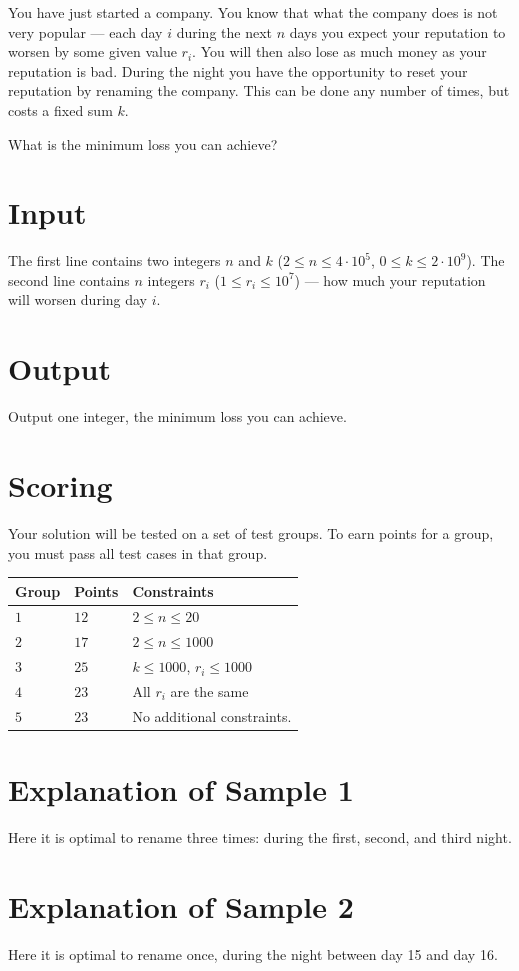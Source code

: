 You have just started a company.
You know that what the company does is not very popular ---
each day $i$ during the next $n$ days you expect your reputation to worsen by some given value $r_i$.
You will then also lose as much money as your reputation is bad.
During the night you have the opportunity to reset your reputation by renaming the company.
This can be done any number of times, but costs a fixed sum $k$.

What is the minimum loss you can achieve?

\section*{Input}
The first line contains two integers $n$ and $k$ ($2 \leq n \leq 4 \cdot 10^5$, $0 \leq k \leq 2 \cdot 10^9$).
The second line contains $n$ integers $r_i$ ($1 \le r_i \le 10^7$) --- how much your reputation will worsen during day $i$.

\section*{Output}
Output one integer, the minimum loss you can achieve.

\section*{Scoring}
Your solution will be tested on a set of test groups. To earn points for a group, you must pass all test cases in that group.

\noindent
\begin{tabular}{| l | l | p{12cm} |}
  \hline
  \textbf{Group} & \textbf{Points} & \textbf{Constraints} \\ \hline
  $1$    & $12$      & $2 \le n \le 20$ \\ \hline
  $2$    & $17$      & $2 \le n \le 1000$ \\ \hline
  $3$    & $25$      & $k \le 1000$, $r_i \le 1000$  \\ \hline
  $4$    & $23$      & All $r_i$ are the same \\ \hline
  $5$    & $23$      & No additional constraints. \\ \hline
\end{tabular}

\section*{Explanation of Sample 1}
Here it is optimal to rename three times: during the first, second, and third night.

\section*{Explanation of Sample 2}
Here it is optimal to rename once, during the night between day 15 and day 16.
